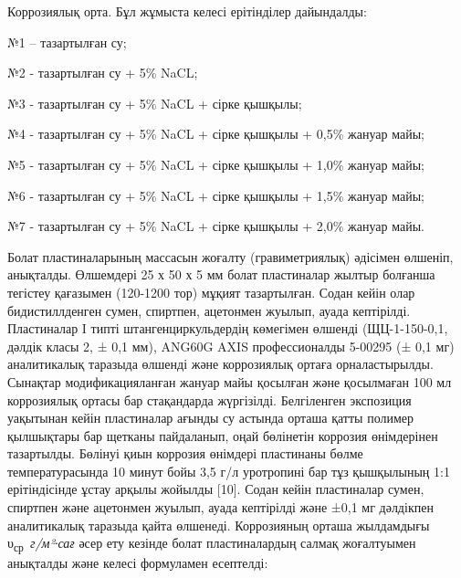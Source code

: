 Коррозиялық орта. Бұл жұмыста келесі ерітінділер дайындалды:

№1 -- тазартылған су;

№2 - тазартылған су + 5\% NaCL;

№3 - тазартылған су + 5\% NaCL + сірке қышқылы;

№4 - тазартылған су + 5\% NaCL + сірке қышқылы + 0,5\% жануар майы;

№5 - тазартылған су + 5\% NaCL + сірке қышқылы + 1,0\% жануар майы;

№6 - тазартылған су + 5\% NaCL + сірке қышқылы + 1,5\% жануар майы;

№7 - тазартылған су + 5\% NaCL + сірке қышқылы + 2,0\% жануар майы.

Болат пластиналарының массасын жоғалту (гравиметриялық) әдісімен
өлшеніп, анықталды. Өлшемдері 25 х 50 х 5 мм болат пластиналар жылтыр
болғанша тегістеу қағазымен (120-1200 тор) мұқият тазартылған. Содан
кейін олар бидистиллденген сумен, спиртпен, ацетонмен жуылып, ауада
кептірілді. Пластиналар I типті штангенциркульдердің көмегімен өлшенді
(ЩЦ-1-150-0,1, дәлдік класы 2, ± 0,1 мм), ANG60G AXIS профессионалды
5-00295 (± 0,1 мг) аналитикалық таразыда өлшенді және коррозиялық ортаға
орналастырылды. Сынақтар модификацияланған жануар майы қосылған және
қосылмаған 100 мл коррозиялық ортасы бар стақандарда жүргізілді.
Белгіленген экспозиция уақытынан кейін пластиналар ағынды су астында
орташа қатты полимер қылшықтары бар щетканы пайдаланып, оңай бөлінетін
коррозия өнімдерінен тазартылды. Бөлінуі қиын коррозия өнімдері
пластинаны бөлме температурасында 10 минут бойы 3,5 г/л уротропині бар
тұз қышқылының 1:1 ерітіндісінде ұстау арқылы жойылды {[}10{]}. Содан
кейін пластиналар сумен, спиртпен және ацетонмен жуылып, ауада
кептірілді және ±0,1 мг дәлдікпен аналитикалық таразыда қайта өлшенеді.
Коррозияның орташа жылдамдығы υ\textsubscript{ср}~\emph{г/м²∙сағ} әсер
ету кезінде болат пластиналардың салмақ жоғалтуымен анықталды және
келесі формуламен есептелді:


